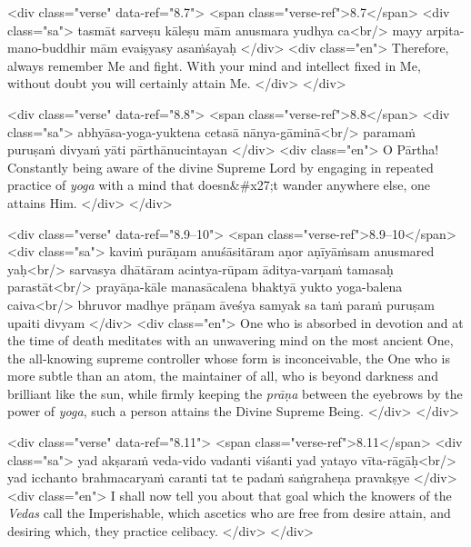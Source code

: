 \begin{html}
<div class="verse" data-ref="8.7">
  <span class="verse-ref">8.7</span>
  <div class="sa">
    tasmāt sarveṣu kāleṣu mām anusmara yudhya ca<br/>
    mayy arpita-mano-buddhir mām evaiṣyasy asaṁśayaḥ
  </div>
  <div class="en">
    Therefore, always remember Me and fight. With your mind and intellect fixed in Me, without doubt you will certainly attain Me.
  </div>
</div>
\end{html}



\begin{html}
<div class="verse" data-ref="8.8">
  <span class="verse-ref">8.8</span>
  <div class="sa">
    abhyāsa-yoga-yuktena cetasā nānya-gāminā<br/>
    paramaṁ puruṣaṁ divyaṁ yāti pārthānucintayan
  </div>
  <div class="en">
    O Pārtha! Constantly being aware of the divine Supreme Lord by engaging in repeated practice of \textit{yoga} with a mind that doesn&#x27;t wander anywhere else, one attains Him.
  </div>
</div>
\end{html}



\begin{html}
<div class="verse" data-ref="8.9–10">
  <span class="verse-ref">8.9–10</span>
  <div class="sa">
    kaviṁ purāṇam anuśāsitāram aṇor aṇīyāṁsam anusmared yaḥ<br/>
    sarvasya dhātāram acintya-rūpam āditya-varṇaṁ tamasaḥ parastāt<br/>
    prayāṇa-kāle manasācalena bhaktyā yukto yoga-balena caiva<br/>
    bhruvor madhye prāṇam āveśya samyak sa taṁ paraṁ puruṣam upaiti divyam
  </div>
  <div class="en">
    One who is absorbed in devotion and at the time of death meditates with an unwavering mind on the most ancient One, the all-knowing supreme controller whose form is inconceivable, the One who is more subtle than an atom, the maintainer of all, who is beyond darkness and brilliant like the sun, while firmly keeping the \textit{prāṇa} between the eyebrows by the power of \textit{yoga}, such a person attains the Divine Supreme Being.
  </div>
</div>
\end{html}



\begin{html}
<div class="verse" data-ref="8.11">
  <span class="verse-ref">8.11</span>
  <div class="sa">
    yad akṣaraṁ veda-vido vadanti viśanti yad yatayo vīta-rāgāḥ<br/>
    yad icchanto brahmacaryaṁ caranti tat te padaṁ saṅgraheṇa pravakṣye
  </div>
  <div class="en">
    I shall now tell you about that goal which the knowers of the \textit{Vedas} call the Imperishable, which ascetics who are free from desire attain, and desiring which, they practice celibacy.
  </div>
</div>
\end{html}



